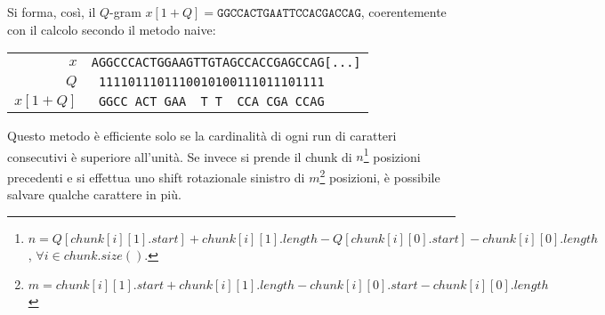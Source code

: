 \begin{example}
	Si forma, così, il $Q$-gram $x[1 + Q] = \texttt{GGCCACTGAATTCCACGACCAG}$, coerentemente con il calcolo secondo il metodo naive:
	\begin{center}
		\begin{tabular}{r || l}
			$x$ & \texttt{AGGCCCACTGGAAGTTGTAGCCACCGAGCCAG[...]} \\
			$Q$ & \texttt{\ 1111011101110010100111011101111} \\
			$x[1 + Q]$ & \texttt{\ GGCC\ ACT\ GAA\ \ T\ T\ \ CCA\ CGA\ CCAG} \\
		\end{tabular}
	\end{center}
\end{example}

Questo metodo è efficiente solo se la cardinalità di ogni run di caratteri consecutivi è superiore all’unità. Se invece si prende il chunk di $n$\footnote{$n = Q[chunk[i][1].start] + chunk[i][1].length - Q[chunk[i][0].start] - chunk[i][0].length$, $\forall i \in chunk.size()$.} posizioni precedenti e si effettua uno shift rotazionale sinistro di $m$\footnote{$m = chunk[i][1].start + chunk[i][1].length - chunk[i][0].start - chunk[i][0].length$} posizioni, è possibile salvare qualche carattere in più.

